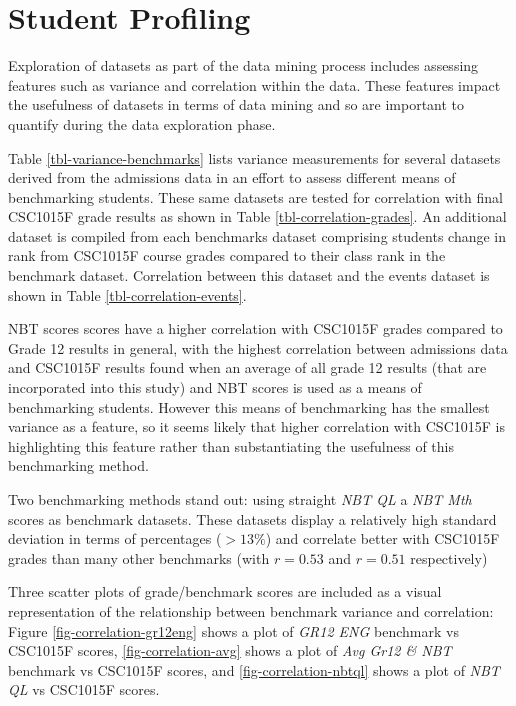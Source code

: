 \section{Student Profiling}
Exploration of datasets as part of the data mining process includes assessing features such as variance and correlation within the data. These features impact the usefulness of datasets in terms of data mining and so are important to quantify during the data exploration phase.

Table \ref{tbl-variance-benchmarks} lists variance measurements for several datasets derived from the admissions data in an effort to assess different means of benchmarking students. These same datasets are tested for correlation with final CSC1015F grade results as shown in Table \ref{tbl-correlation-grades}. An additional dataset is compiled from each benchmarks dataset comprising students change in rank from CSC1015F course grades compared to their class rank in the benchmark dataset. Correlation between this dataset and the events dataset is shown in Table \ref{tbl-correlation-events}.





NBT scores scores have a higher correlation with CSC1015F grades compared to Grade 12 results in general, with the highest correlation between admissions data and CSC1015F results found when an average of all grade 12 results (that are incorporated into this study) and NBT scores is used as a means of benchmarking students. However this means of benchmarking has the smallest variance as a feature, so it seems likely that higher correlation with CSC1015F is highlighting this feature rather than substantiating the usefulness of this benchmarking method.

Two benchmarking methods stand out: using straight \textit{NBT QL} a \textit{NBT Mth} scores as benchmark datasets. These datasets display a relatively high standard deviation in terms of percentages ($> 13\%$) and correlate better with CSC1015F grades than many other benchmarks (with $r = 0.53$ and $r = 0.51$ respectively)

Three scatter plots of grade/benchmark scores are included as a visual representation of the relationship between benchmark variance and correlation: Figure \ref{fig-correlation-gr12eng} shows a plot of \textit{GR12 ENG} benchmark vs CSC1015F scores, \ref{fig-correlation-avg} shows a plot of \textit{Avg Gr12 \& NBT} benchmark vs CSC1015F scores, and \ref{fig-correlation-nbtql} shows a plot of \textit{NBT QL} vs CSC1015F scores.

